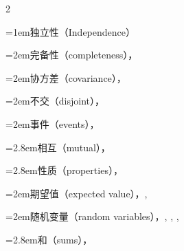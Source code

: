 \begin{multicols}{2}
\par\addvspace{2pt}
\par\noindent\hangindent=1em\hspace*{0em}\label{idx:546}独立性（Independence）\par
\par\noindent\hangindent=2em\hspace*{1em}\label{idx:547}完备性（completeness），\hyperref[thm:6.2.24]{\pageref*{thm:6.2.24}}\par
\par\noindent\hangindent=2em\hspace*{1em}\label{idx:548}协方差（covariance），\hyperref[thm:4.5.5]{\pageref*{thm:4.5.5}}\par
\par\noindent\hangindent=2em\hspace*{1em}\label{idx:549}不交（disjoint），\hyperref[exercise:1.39]{\pageref*{exercise:1.39}}\par
\par\noindent\hangindent=2em\hspace*{1em}\label{idx:550}事件（events），\hyperref[def:1.3.7]{\pageref*{def:1.3.7}}\par
\par\noindent\hangindent=2.8em\hspace*{1.8em}\label{idx:551}相互（mutual），\hyperref[def:1.3.12]{\pageref*{def:1.3.12}}\par
\par\noindent\hangindent=2.8em\hspace*{1.8em}\label{idx:552}性质（properties），\hyperref[thm:1.3.9]{\pageref*{thm:1.3.9}}\par
\par\noindent\hangindent=2em\hspace*{1em}\label{idx:553}期望值（expected value），\hyperref[thm:4.2.10]{\pageref*{thm:4.2.10}}, \hyperref[thm:4.6.6]{\pageref*{thm:4.6.6}}\par
\par\noindent\hangindent=2em\hspace*{1em}\label{idx:554}随机变量（random variables），\hyperref[def:4.2.5]{\pageref*{def:4.2.5}}, \hyperref[thm:4.3.5]{\pageref*{thm:4.3.5}}, \hyperref[def:4.6.5]{\pageref*{def:4.6.5}}, \hyperref[def:5.1.1]{\pageref*{def:5.1.1}}\par
\par\noindent\hangindent=2.8em\hspace*{1.8em}\label{idx:555}和（sums），\hyperref[thm:4.2.12]{\pageref*{thm:4.2.12}}\par

\end{multicols}
